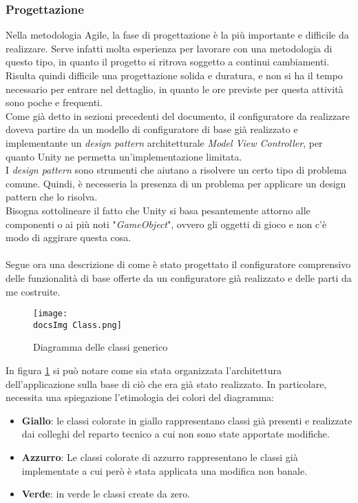\subsubsection{Progettazione}
Nella metodologia Agile, la fase di progettazione \`e la pi\`u importante e difficile da realizzare. Serve infatti molta esperienza per lavorare con una metodologia di questo tipo, in quanto il progetto si ritrova soggetto a continui cambiamenti. Risulta quindi difficile una progettazione solida e duratura, e non si ha il tempo necessario per entrare nel dettaglio, in quanto le ore previste per questa attivit\`a sono poche e frequenti.\\
Come gi\`a detto in sezioni precedenti del documento, il configuratore da realizzare doveva partire da un modello di configuratore di base gi\`a realizzato e implementante un \textit{design pattern} architetturale \textit{Model View Controller}, per quanto Unity ne permetta un'implementazione limitata.\\
I \textit{design pattern} sono strumenti che aiutano a risolvere un certo tipo di problema comune. Quindi, \`e necesseria la presenza di un problema per applicare un design pattern che lo risolva.\\
Bisogna sottolineare il fatto che Unity si basa pesantemente attorno alle componenti o ai pi\`u noti "\textit{GameObject}", ovvero gli oggetti di gioco e non c'\`e modo di aggirare questa cosa.\\\\
Segue ora una descrizione di come \`e stato progettato il configuratore comprensivo delle funzionalit\`a di base offerte da un configuratore gi\`a realizzato e delle parti da me costruite.\\


\begin{figure}[H]
	\centering
	\texttt{[image: \\docsImg Class.png]}
	\caption{Diagramma delle classi generico}
	\label{fig:Diagramma delle classi}
\end{figure}
\newpage

In figura \ref{fig:Diagramma delle classi} si pu\`o notare come sia stata organizzata l'architettura dell'applicazione sulla base di ci\`o che era gi\`a stato realizzato. In particolare, necessita una spiegazione l'etimologia dei colori del diagramma:

\begin{itemize}
	\item \textbf{Giallo}: le classi colorate in giallo rappresentano classi gi\`a presenti e realizzate dai colleghi del reparto tecnico a cui non sono state apportate modifiche.
	\item \textbf{Azzurro}: Le classi colorate di azzurro rappresentano le classi gi\`a implementate a cui per\`o \`e stata applicata una modifica non banale.
	\item \textbf{Verde}: in verde le classi create da zero.
\end{itemize}

